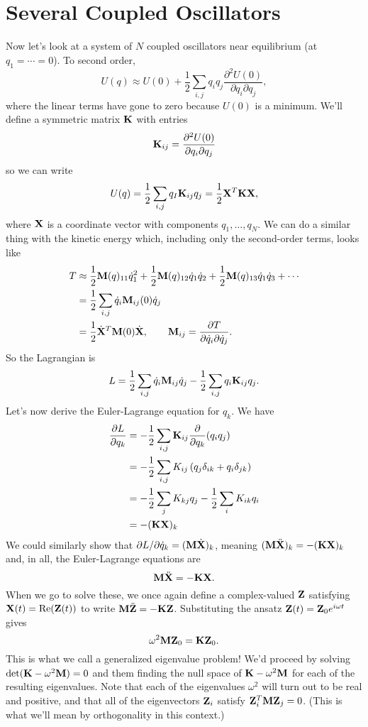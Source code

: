 \documentclass[../p111main.tex]{subfiles}
\begin{document}
\section{Several Coupled Oscillators}
Now let's look at a system of $N$ coupled oscillators near equilibrium (at $q_1 = \cdots = 0$).
To second order,
\[ U(q) \approx U(0) + \frac{1}{2} \sum_{i,j}^{} q_i q_j \frac{\partial^2 U(0)}{\partial q_i \partial q_j}, \]
where the linear terms have gone to zero because $U(0)$ is a minimum.
We'll define a symmetric matrix $\mathbf{K}$ with entries
\[ \mathbf{K}_{ij} = \frac{\partial^2 U(0)}{\partial q_i \partial q_j} \]
so we can write
\[ U(q) = \frac{1}{2} \sum_{i,j}^{} q_I \mathbf{K}_{ij} q_j = \frac{1}{2} \mathbf{X}^T \mathbf{K} \mathbf{X}, \]
where $\mathbf{X}$ is a coordinate vector with components $q_1, \ldots, q_N$.
We can do a similar thing with the kinetic energy which, including only the second-order terms, looks like
\begin{align*}
    T &\approx \frac{1}{2} \mathbf{M}(q)_{11} \dot q_1^2 + \frac{1}{2} \mathbf{M}(q)_{12} \dot q_1 \dot q_2 + \frac{1}{2} \mathbf{M}(q)_{13} \dot q_1 \dot q_3 + \cdots \\
    &= \frac{1}{2} \sum_{i,j}^{} \dot q_i \mathbf{M}_{ij}(0) \dot q_j \\
    &= \frac{1}{2} \dot{\mathbf{X}}^T \mathbf{M}(0) \dot{\mathbf{X}}, \qquad \mathbf{M}_{ij} = \frac{\partial T}{\partial \dot q_i \partial \dot q_j}.
\end{align*}
So the Lagrangian is
\[ L = \frac{1}{2} \sum_{i,j}^{} \dot q_i \mathbf{M}_{ij} \dot q_j - \frac{1}{2} \sum_{i,j}^{} q_i \mathbf{K}_{ij} q_j. \]
Let's now derive the Euler-Lagrange equation for $q_k$.
We have
\begin{align*}
    \frac{\partial L}{\partial q_k} &= -\frac{1}{2} \sum_{i,j}^{} \mathbf{K}_{ij} \frac{\partial}{\partial q_k} (q_i q_j) \\
    &= -\frac{1}{2} \sum_{i,j}^{} K_{ij} \left( q_j \delta_{ik} + q_i \delta_{jk} \right) \\
    &= -\frac{1}{2} \sum_{j}^{} K_{kj} q_j - \frac{1}{2} \sum_{i}^{} K_{ik} q_i \\
    &= -(\mathbf{K} \mathbf{X})_k
\end{align*}
We could similarly show that $\partial L / \partial \dot q_k = (\mathbf{M} \dot{\mathbf{X}})_k$, meaning $(\mathbf{M} \ddot{\mathbf{X}})_k = -(\mathbf{K} \mathbf{X})_k$ and, in all, the Euler-Lagrange equations are
\[ \mathbf{M} \ddot{\mathbf{X}} = -\mathbf{K} \mathbf{X}. \]
When we go to solve these, we once again define a complex-valued $\mathbf{Z}$ satisfying $\mathbf{X}(t) = \operatorname{Re} (\mathbf{Z}(t))$ to write $\mathbf{M} \ddot{\mathbf{Z}} = -\mathbf{K} \mathbf{Z}$.
Substituting the ansatz $\mathbf{Z}(t) = \mathbf{Z}_0 e^{i \omega t}$ gives
\[ \omega^2 \mathbf{M} \mathbf{Z}_0 = \mathbf{K} \mathbf{Z}_0 .\]
This is what we call a generalized eigenvalue problem!
We'd proceed by solving $\det (\mathbf{K} - \omega^2 \mathbf{M}) = 0$ and them finding the null space of $\mathbf{K} - \omega^2 \mathbf{M}$ for each of the resulting eigenvalues.
Note that each of the eigenvalues $\omega^2$ will turn out to be real and positive, and that all of the eigenvectors $\mathbf{Z}_i$ satisfy $\mathbf{Z}_i^T \mathbf{M} \mathbf{Z}_j = 0$.
(This is what we'll mean by orthogonality in this context.)
\end{document}
